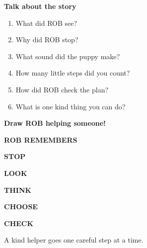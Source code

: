 \documentclass[14pt,openany]{book}
\begin{document}
\clearpage\thispagestyle{empty}
\vspace*{0.45in}
\begin{center}
{\robdisplay\bfseries\fontsize{25}{30}\selectfont Talk about the story}\par
\vspace{0.3in}
\begin{minipage}{0.78\textwidth}
\fontsize{16}{23}\selectfont
\begin{enumerate}
  \item What did ROB see?
  \item Why did ROB stop?
  \item What sound did the puppy make?
  \item How many little steps did you count?
  \item How did ROB check the plan?
  \item What is one kind thing you can do?
\end{enumerate}
\end{minipage}
\vspace{0.35in}

{\robdisplay\bfseries\fontsize{20}{24}\selectfont Draw ROB helping someone!}
\end{center}

\clearpage\thispagestyle{empty}
\vspace*{1.1in}
\begin{center}
{\robdisplay\bfseries\fontsize{27}{32}\selectfont ROB REMEMBERS}\par
\vspace{0.55in}
{\robdisplay\bfseries\fontsize{22}{30}\selectfont\color{ROBRed} STOP}\par
{\robdisplay\bfseries\fontsize{22}{30}\selectfont\color{ROBCyan} LOOK}\par
{\robdisplay\bfseries\fontsize{22}{30}\selectfont\color{ROBAmber} THINK}\par
{\robdisplay\bfseries\fontsize{22}{30}\selectfont\color{ROBGreen} CHOOSE}\par
{\robdisplay\bfseries\fontsize{22}{30}\selectfont\color{ROBPurple} CHECK}\par
\vspace{0.6in}
{\fontsize{15}{22}\selectfont A kind helper goes one careful step at a time.}
\end{center}
\end{document}
